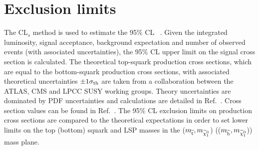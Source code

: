 \section{Exclusion limits}
\label{sec:STAT}

The CL$_{s}$ method is used to estimate the 95\% \ac{CL} ~\cite{bib:STAT_RooStats,PDG}.
Given the integrated luminosity, signal acceptance, background expectation and number of observed events (with associated uncertainties),
the 95\% \ac{CL} upper limit on the signal cross section is calculated. 
The theoretical top-squark production cross sections, which are equal to the bottom-squark production cross sections, with associated theoretical uncertainties $\pm1\sigma_{\rm th}$ are taken from a collaboration between the \ac{ATLAS}, \ac{CMS}
and \ac{LPCC} \ac{SUSY} working groups. 
Theory uncertainties are dominated by PDF uncertainties 
and calculations are detailed in Ref.~\cite{bib:SUSYxs}. 
Cross section values can be found in Ref.~\cite{stopsbottomxs}.  
The 95\% \ac{CL} exclusion limits on production cross sections are compared to the theoretical expectations in order to set lower limits on the top (bottom) squark and LSP masses in the ($m_{\widetilde{{\rm t}}}, m_{\widetilde{\chi}^{0}_{1}}$) (($m_{\widetilde{{\rm b}}}, m_{\widetilde{\chi}^{0}_{1}}$)) mass plane. 


